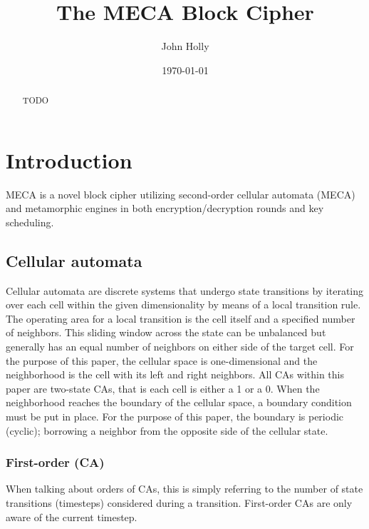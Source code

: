 \documentclass{article}
\title{\textbf{The MECA Block Cipher}}
\author{John Holly}
\date{\today}
\begin{document}
\maketitle

\newcommand{\Desc}[2]{\State \makebox[2em][l]{#1}#2}

\begin{abstract}
  \centering
  \begin{minipage}{\dimexpr\paperwidth-10cm}
    TODO
  \end{minipage}
\end{abstract}

\bigskip

\section{Introduction}

MECA is a novel block cipher utilizing second-order cellular automata (MECA) and metamorphic engines in both encryption/decryption rounds and key scheduling.

\subsection{Cellular automata}

Cellular automata are discrete systems that undergo state transitions by iterating over each cell within the given dimensionality by means of a local transition rule. The operating area for a local transition is the cell itself and a specified number of neighbors. This sliding window across the state can be unbalanced but generally has an equal number of neighbors on either side of the target cell. For the purpose of this paper, the cellular space is one-dimensional and the neighborhood is the cell with its left and right neighbors. All CAs within this paper are two-state CAs, that is each cell is either a 1 or a 0. When the neighborhood reaches the boundary of the cellular space, a boundary condition must be put in place. For the purpose of this paper, the boundary is periodic (cyclic); borrowing a neighbor from the opposite side of the cellular state. 

\subsubsection{First-order (CA)}

When talking about orders of CAs, this is simply referring to the number of state transitions (timesteps) considered during a transition. First-order CAs are only aware of the current timestep. 
\end{document}

